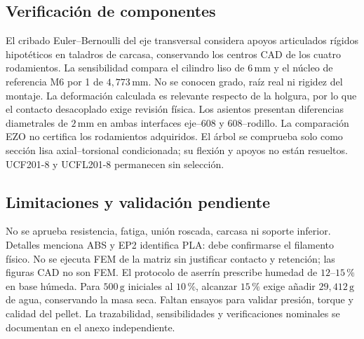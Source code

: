 \subsection{Verificación de componentes}
El cribado Euler--Bernoulli del eje transversal considera apoyos articulados rígidos hipotéticos
en taladros de carcasa, conservando los centros CAD de los cuatro rodamientos.
La sensibilidad compara el cilindro liso de $6\,\mathrm{mm}$ y el núcleo de referencia
M6 por 1 de $4,773\,\mathrm{mm}$\parencite{tr_rosca_m6_2026}.
No se conocen grado, raíz real ni rigidez del montaje. La deformación calculada es relevante
respecto de la holgura, por lo que el contacto desacoplado exige revisión física.
Los asientos presentan diferencias diametrales de $2\,\mathrm{mm}$ en ambas interfaces
eje--608 y 608--rodillo. La comparación EZO\parencite{ezo_608zz_2026} no certifica los rodamientos adquiridos.
El árbol se comprueba solo como sección lisa axial--torsional condicionada;
su flexión y apoyos no están resueltos. UCF201-8 y UCFL201-8 permanecen sin selección.
\subsection{Limitaciones y validación pendiente}
No se aprueba resistencia, fatiga, unión roscada, carcasa ni soporte inferior.
Detalles menciona ABS y EP2 identifica PLA: debe confirmarse el filamento físico.
No se ejecuta FEM de la matriz sin justificar contacto y retención; las figuras CAD no son FEM.
El protocolo de aserrín prescribe humedad de $12$--$15\,\%$ en base húmeda.
Para $500\,\mathrm{g}$ iniciales al $10\,\%$, alcanzar $15\,\%$ exige añadir $29,412\,\mathrm{g}$
de agua, conservando la masa seca. Faltan ensayos para validar presión, torque y calidad del pellet.
La trazabilidad, sensibilidades y verificaciones nominales se documentan en el anexo independiente.
